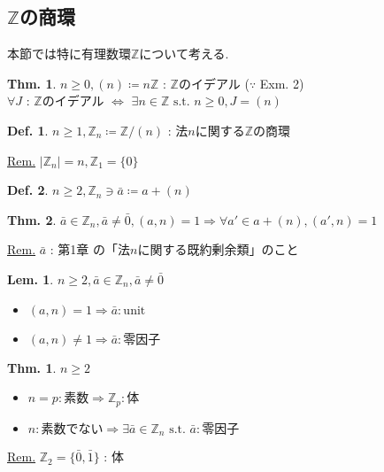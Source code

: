 \documentclass[uplatex,dvipdfmx,9pt]{beamer}
\newcommand{\st}{\text{ s.t. }}
\newcommand{\sscount}{\textsection \thesubsection}
\newcounter{textThmCount}
\newcounter{textLemCount}
\newcounter{textExmCount}
\theoremstyle{definition} %
\newtheorem{defn}{Def.}[subsection] %
\newtheorem{thm}{Thm.}[subsection] %
\newtheorem{thmText}[textThmCount]{Thm.}
\newtheorem{lemText}[textLemCount]{Lem.} %
\theoremstyle{example}
\begin{document}
    \subsection{\sscount \texorpdfstring{ $\mathbb{Z}$}{Z}の商環}
    \setcounter{textExmCount}{0}

    \begin{frame}
      本節では特に有理数環$\mathbb{Z}$について考える.
      
      \begin{thm}
        $n \ge 0, (n) \coloneqq n\mathbb{Z}$ : $\mathbb{Z}$のイデアル ($\because$  Exm. 2) \\
        $\forall J$ : $\mathbb{Z}$のイデアル $\Leftrightarrow$ $\exists n \in \mathbb{Z} \st n \ge 0, J = (n)$
      \end{thm}

      \begin{defn}
        $n \ge 1, \mathbb{Z}_n \coloneqq \mathbb{Z} / (n)$ : 法$n$に関する$\mathbb{Z}$の商環
      \end{defn}
      \underline{Rem.} $|\mathbb{Z}_n| = n, \mathbb{Z}_1 = \{0\}$

      \begin{defn}
        $n \ge 2, \mathbb{Z}_n \ni \bar{a} \coloneqq a + (n)$
      \end{defn}

    \end{frame}

    \begin{frame}

      \begin{thm}
        $\bar{a} \in \mathbb{Z}_n, \bar{a} \neq \bar{0}, (a, n) = 1 \Rightarrow \forall a' \in a + (n), (a', n) = 1$
      \end{thm}
      \underline{Rem.} $\bar{a}$ : 第1章  の「法$n$に関する既約剰余類」のこと

      \begin{lemText}
        $n \ge 2, \bar{a} \in \mathbb{Z}_n, \bar{a} \neq \bar{0}$
        \begin{itemize}
          \item $(a, n) = 1 \Rightarrow \bar{a} : \text{unit}$
          \item $(a, n) \neq 1 \Rightarrow \bar{a} : \text{零因子}$
        \end{itemize}
      \end{lemText}

      \begin{thmText}
        $n \ge 2$
        \begin{itemize}
          \item $n = p : \text{素数} \Rightarrow \mathbb{Z}_p : \text{体}$
          \item $n : \text{素数でない} \Rightarrow \exists \bar{a} \in \mathbb{Z}_n \st \bar{a} : \text{零因子}$
        \end{itemize}
      \end{thmText}
      \underline{Rem.} $\mathbb{Z}_2 = \{\bar{0}, \bar{1}\}$ : 体

    \end{frame}
\end{document}
